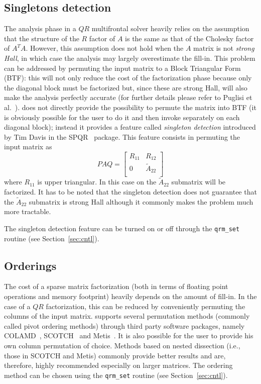 \documentclass[11pt]{article}
\begin{document}
\subsection{Singletons detection}
\label{sec:singleton}
The analysis phase in a $QR$ multifrontal solver heavily relies on the
assumption that the structure of the $R$ factor of $A$ is the same as
that of the Cholesky factor of $A^TA$. However, this assumption does
not hold when the $A$ matrix is not {\it strong Hall}, in which case the
analysis may largely overestimate the fill-in. This problem can be
addressed by permuting the input matrix to a Block Triangular Form
(BTF): this will not only reduce the cost of the factorization phase
because only the diagonal block must be factorized but, since these
are strong Hall, will also make the analysis perfectly accurate (for
further details please refer to Puglisi et al.~\cite{pugl:93}). \qrm
does not directly provide the possibility to permute the matrix
into BTF (it is obviously possible for the user to do it and then
invoke \qrm separately on each diagonal block); instead it provides a
feature called {\it singleton detection} introduced by Tim Davis in
the SPQR~\cite{Davis:2011:A9S:2049662.2049670} package. This feature
consists in permuting the input matrix as
\begin{displaymath}
  PAQ = \left[
    \begin{array}{cc}
      R_{11} & R_{12} \\
      0      & \tilde{A}_{22}\\
    \end{array}\right]
\end{displaymath}
where $R_{11}$ is upper triangular. In this case on the
$\tilde{A}_{22}$ submatrix will be factorized. It has to be noted that
the singleton detection does not guarantee that the $\tilde{A}_{22}$
submatrix is strong Hall although it commonly makes the problem much
more tractable.

The singleton detection feature can be turned on or off through the
\texttt{qrm\_set} routine (see Section~\ref{sec:cntl}).


\subsection{Orderings}
The cost of a sparse matrix factorization (both in terms of floating
point operations and memory footprint) heavily depends on the amount
of fill-in. In the case of a $QR$ factorization, this can be reduced
by conveniently permuting the columns of the input matrix. \qrm
supports several permutation methods (commonly called pivot ordering
methods) through third party software packages, namely
COLAMD~\cite{Davis:2004:CAM:1024074.1024079}, SCOTCH~\cite{pelle:07}
and Metis~\cite{Karypis:1998:FHQ:305219.305248}. It is also possible
for the user to provide his own column permutation of choice. Methods
based on nested dissection (i.e., those in SCOTCH and Metis) commonly
provide better results and are, therefore, highly recommended
especially on larger matrices. The ordering method can be chosen using
the \texttt{qrm\_set} routine (see Section~\ref{sec:cntl}).
\end{document}

